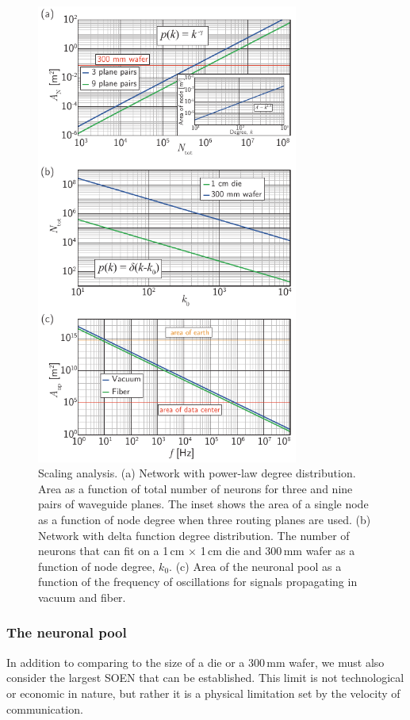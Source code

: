 \documentclass[twocolumn]{article}
\begin{document}
 \begin{figure}[t!]
	\centerline{\includegraphics[width=8.6cm]{_networks_scaling_small.pdf}}
	\caption{\label{fig:networks_scaling}Scaling analysis. (a) Network with power-law degree distribution. Area as a function of total number of neurons for three and nine pairs of waveguide planes. The inset shows the area of a single node as a function of node degree when three routing planes are used. (b) Network with delta function degree distribution. The number of neurons that can fit on a 1\,cm $\times$ 1\,cm die and 300\,mm wafer as a function of node degree, $k_0$. (c) Area of the neuronal pool as a function of the frequency of oscillations for signals propagating in vacuum and fiber.}
\end{figure}

\subsubsection{\label{sec:neuronalPool}The neuronal pool}
In addition to comparing to the size of a die or a 300\,mm wafer, we must also consider the largest SOEN that can be established. This limit is not technological or economic in nature, but rather it is a physical limitation set by the velocity of communication. 
\end{document}
